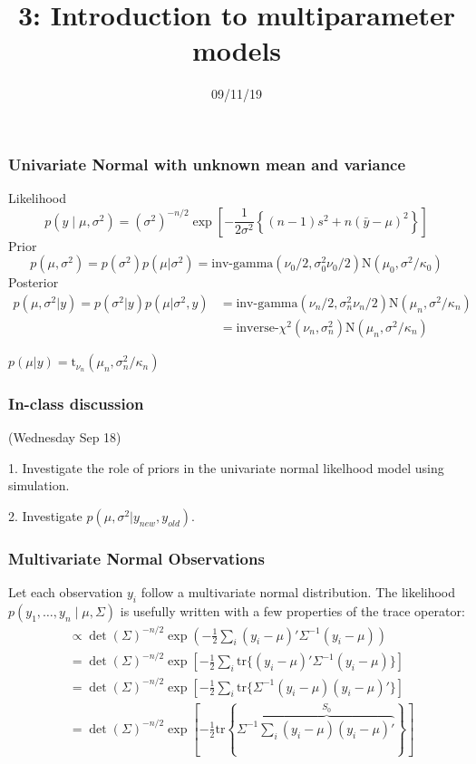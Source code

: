 \documentclass{beamer}
\title["3"]{3: Introduction to multiparameter models}
\date{09/11/19}
\begin{document}

\begin{frame}
\titlepage 
\end{frame}


\begin{frame}
  \frametitle{Univariate Normal with unknown mean and variance}
Likelihood
\[
p(y \mid \mu, \sigma^2) = (\sigma^2)^{-n/2} \exp\left[ - \frac{1}{2\sigma^2}\left\{(n-1)  s^2 + n(\bar{y} - \mu)^2 \right\} \right]
\]
Prior
\[p(\mu, \sigma^2) = p(\sigma^2) p(\mu|\sigma^2) = \mbox{inv-gamma}(\nu_0/2, \sigma_0^2\nu_0/2) \mbox{N}(\mu_0, \sigma^2/\kappa_0)
\]
Posterior
\begin{align*}
  p(\mu, \sigma^2|y) = p(\sigma^2|y) p(\mu|\sigma^2,y) &= \mbox{inv-gamma}(\nu_n/2, \sigma_n^2\nu_n/2) \mbox{N}(\mu_n, \sigma^2/\kappa_n)\\
  &=\mbox{inverse-}\chi^2(\nu_n, \sigma_n^2) \mbox{N}(\mu_n, \sigma^2/\kappa_n)
\end{align*}

$p(\mu|y) = \mbox{t}_{\nu_n}(\mu_n, \sigma_n^2/\kappa_n)$
\end{frame}


\begin{frame}
  \frametitle{In-class discussion}
  (Wednesday Sep 18)

  \vspace{0.5cm}
  
  1. Investigate the role of priors in the univariate normal likelhood model using simulation.
  
  2. Investigate $p(\mu, \sigma^2|y_{new}, y_{old})$.

\end{frame}

\begin{frame}[fragile]
\frametitle{Multivariate Normal Observations}

Let each observation $y_i$ follow a multivariate normal distribution. The likelihood $p(y_1, \ldots, y_n \mid \mu, \Sigma)$ is usefully written with a few properties of the trace operator:
\begin{align*}
&\propto \det(\Sigma)^{-n/2} \exp\left(-\frac{1}{2}\sum_i (y_i - \mu)'\Sigma^{-1}(y_i- \mu) \right) \\
&= \det(\Sigma)^{-n/2} \exp\left[-\frac{1}{2}\sum_i \text{tr}\{ (y_i - \mu)'\Sigma^{-1}(y_i- \mu) \} \right] \\
&= \det(\Sigma)^{-n/2} \exp\left[-\frac{1}{2}\sum_i \text{tr}\{ \Sigma^{-1}(y_i- \mu)(y_i - \mu)' \} \right] \\
&= \det(\Sigma)^{-n/2} \exp\left[-\frac{1}{2} \text{tr}\left\{\Sigma^{-1} \overbrace{\sum_i  (y_i- \mu)(y_i - \mu)'}^{S_0} \right\} \right]
\end{align*}

\end{frame}
\end{document}
